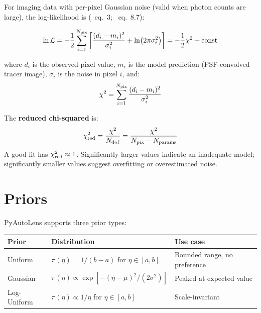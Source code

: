 \documentclass[11pt, letterpaper]{article}
\begin{document}
For imaging data with per-pixel Gaussian noise (valid when photon
counts are large), the log-likelihood is (\Night\ eq.~3; \CK\ eq.~8.7):

\begin{keyresult}
\begin{equation}
\ln \mathcal{L} = -\frac{1}{2} \sum_{i=1}^{N_{\rm pix}}
\left[ \frac{(d_i - m_i)^2}{\sigma_i^2} + \ln(2\pi\sigma_i^2) \right]
= -\frac{1}{2}\chi^2 + \text{const}
\label{eq:log-likelihood}
\end{equation}
\end{keyresult}

\noindent where $d_i$ is the observed pixel value, $m_i$ is the model
prediction (PSF-convolved tracer image), $\sigma_i$ is the noise in
pixel $i$, and:
\begin{equation}
\chi^2 = \sum_{i=1}^{N_{\rm pix}} \frac{(d_i - m_i)^2}{\sigma_i^2}
\label{eq:chi-squared}
\end{equation}

The \textbf{reduced chi-squared} is:
\begin{equation}
\chi^2_{\rm red} = \frac{\chi^2}{N_{\rm dof}}
= \frac{\chi^2}{N_{\rm pix} - N_{\rm params}}
\label{eq:chi-squared-red}
\end{equation}
A good fit has $\chi^2_{\rm red} \approx 1$. Significantly larger values
indicate an inadequate model; significantly smaller values suggest
overfitting or overestimated noise.

\section{Priors}
\label{sec:priors}

PyAutoLens supports three prior types:

\begin{table}[H]
\centering
\begin{tabular}{lll}
\toprule
Prior & Distribution & Use case \\
\midrule
Uniform & $\pi(\eta) = 1/(b-a)$ for $\eta \in [a,b]$ & Bounded range, no preference \\
Gaussian & $\pi(\eta) \propto \exp[-(\eta-\mu)^2/(2\sigma^2)]$ & Peaked at expected value \\
Log-Uniform & $\pi(\eta) \propto 1/\eta$ for $\eta \in [a,b]$ & Scale-invariant \\
\bottomrule
\end{tabular}
\end{table}
\end{document}
